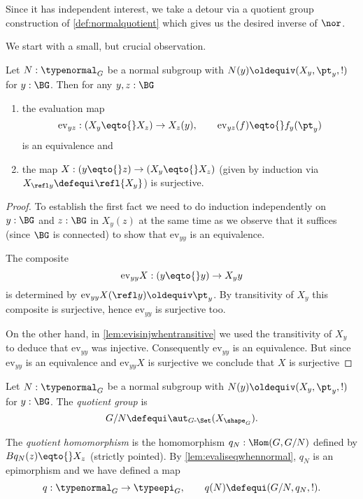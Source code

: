 Since it has independent interest, we take a detour via a quotient group construction of \cref{def:normalquotient} which gives us the desired inverse of $\nor$.

We start with a small, but crucial observation.
\begin{lemma}
  \label{lem:evaliseqwhennormal}
  Let $N:\typenormal_G$ be a normal subgroup with $N(y)\oldequiv (X_y,\pt_y,!)$ for $y:\BG$.
  Then for any $y,z:\BG$
  \begin{enumerate}
  \item the evaluation map
$$\mathrm{ev}_{yz}:(X_y\eqto{}X_z)\to X_z(y),\qquad \mathrm{ev}_{yz}(f)\eqto{}f_y(\pt_y)$$
is an equivalence and
  \item  the map $X:(y\eqto{}z)\to(X_y\eqto{}X_z)$ (given by induction via $X_{\refl y}\defequi\refl{X_y}$) is surjective.
  \end{enumerate}
\end{lemma}
\begin{proof}
To establish the first fact we need to do induction independently on $y:\BG$ and $z:\BG$ in $X_y(z)$ at the same time as we observe that it suffices (since $\BG$ is connected) to show that $\mathrm{ev}_{yy}$ is an equivalence.

The composite
$$\mathrm{ev}_{yy}X:(y\eqto{}y)\to X_yy$$ is determined by $\mathrm{ev}_{yy}X(\refl y)\oldequiv \pt_y$.
By transitivity of $X_y$ this composite is surjective, hence $\mathrm{ev}_{yy}$ is surjective too.

On the other hand, in  \cref{lem:evisinjwhentransitive} we used the transitivity of $X_y$ to deduce that $\mathrm{ev}_{yy}$ was injective.  Consequently $\mathrm{ev}_{yy}$ is an equivalence.  But since $\mathrm{ev}_{yy}$ is an equivalence and $\mathrm{ev}_{yy}X$ is surjective we conclude that $X$ is surjective
\end{proof}
\begin{definition}
\label{def:normalquotient}
Let $N:\typenormal_G$ be a normal subgroup with $N(y)\oldequiv (X_y,\pt_y,!)$ for $y:\BG$.  The \emph{quotient group} is
$$G/N\defequi\aut_{G\text{-}\Set}(X_{\shape_G}).
$$

The \emph{quotient homomorphism} is the homomorphism $q_N:\Hom(G,G/N)$  defined by $Bq_N(z)\eqto{}X_z$ (strictly pointed).
By \cref{lem:evaliseqwhennormal}, $q_N$ is an epimorphism and we have defined a map
$$q:\typenormal_G\to\typeepi_G,\qquad q(N)\defequi(G/N,q_N,!).$$
\end{definition}

